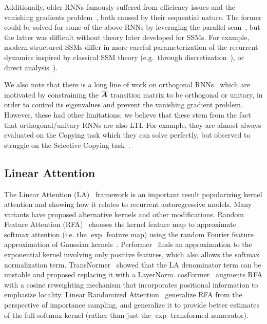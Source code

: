 Additionally, older RNNs famously suffered from efficiency issues and the vanishing gradients problem~\citep{hochreiter1991untersuchungen,hochreiter2001gradient,pascanu2013difficulty},
both caused by their sequential nature.
The former could be solved for some of the above RNNs by leveraging the parallel scan~\citep{martin2018parallelizing},
but the latter was difficult without theory later developed for SSMs.
For example, modern structured SSMs differ in more careful parameterization of the recurrent dynamics inspired by classical SSM theory (e.g.\ through discretization~\citep{gu2021combining,gu2023train}), or direct analysis~\citep{orvieto2023resurrecting,kaul2020linear,gupta2022simplifying}).

We also note that there is a long line of work on orthogonal RNNs~\citep{arjovsky2016unitary,henaff2016recurrent,mhammedi2017efficient,vorontsov2017orthogonality,lezcano2019cheap}
which are motivated by constraining the $\overline{\bm{A}}$ transition matrix to be orthogonal or unitary,
in order to control its eigenvalues and prevent the vanishing gradient problem.
However, these had other limitations; we believe that these stem from the fact that orthogonal/unitary RNNs are also LTI.
For example, they are almost always evaluated on the Copying task which they can solve perfectly, but observed to struggle on the Selective Copying task~\citep{jing2019gated}.

\subsection{Linear Attention}

The Linear Attention (LA)~\citep{katharopoulos2020transformers} framework is an important result popularizing kernel attention and showing how it relates to recurrent autoregressive models.
Many variants have proposed alternative kernels and other modifications.
Random Feature Attention (RFA)~\citep{peng2021random} chooses the kernel feature map to approximate softmax attention (i.e. the $\exp$ feature map) using the random Fourier feature approximation of Gaussian kernels~\citep{rahimi2007random}.
Performer~\citep{choromanski2021rethinking} finds an approximation to the exponential kernel involving only positive features, which also allows the softmax normalization term.
TransNormer~\citep{qin2022devil} showed that the LA denominator term can be unstable and proposed replacing it with a LayerNorm.
cosFormer~\citep{qin2022cosformer} augments RFA with a cosine reweighting mechanism that incorporates positional information to emphasize locality.
Linear Randomized Attention~\citep{zheng2022linear} generalize RFA from the perspective of importance sampling, and generalize it to provide better estimates of the full softmax kernel (rather than just the $\exp$-transformed numerator).

